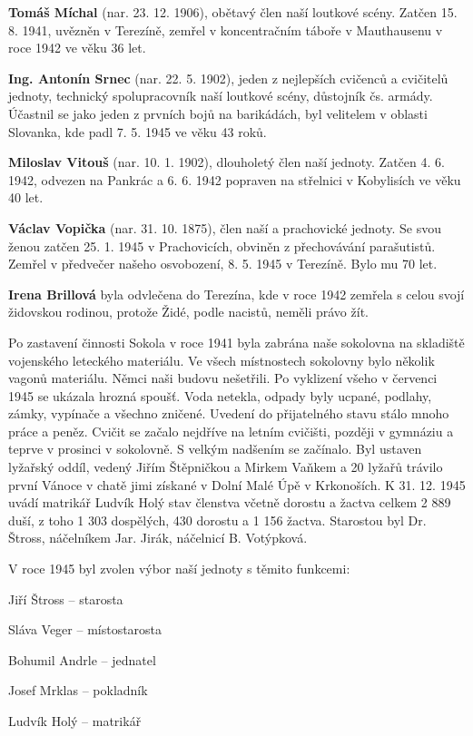 \textbf{Tomáš Míchal} (nar. 23. 12. 1906), obětavý člen naší loutkové
scény. Zatčen 15. 8. 1941, uvězněn v Terezíně, zemřel v koncentračním
táboře v Mauthausenu v roce 1942 ve věku 36 let.

\textbf{Ing. Antonín Srnec} (nar. 22. 5. 1902), jeden z nejlepších
cvičenců a cvičitelů jednoty, technický spolupracovník naší loutkové
scény, důstojník čs. armády. Účastnil se jako jeden z prvních bojů na
barikádách, byl velitelem v oblasti Slovanka, kde padl 7. 5. 1945 ve
věku 43 roků.

\textbf{Miloslav Vitouš} (nar. 10. 1. 1902), dlouholetý člen naší
jednoty. Zatčen 4. 6. 1942, odvezen na Pankrác a 6. 6. 1942 popraven na
střelnici v Kobylisích ve věku 40 let.

\textbf{Václav Vopička} (nar. 31. 10. 1875), člen naší a prachovické
jednoty. Se svou ženou zatčen 25. 1. 1945 v Prachovicích, obviněn z
přechovávání parašutistů. Zemřel v předvečer našeho osvobození, 8. 5.
1945 v Terezíně. Bylo mu 70 let.

\textbf{Irena Brillová} byla odvlečena do Terezína, kde v roce 1942
zemřela s celou svojí židovskou rodinou, protože Židé, podle nacistů,
neměli právo žít.

Po zastavení činnosti Sokola v roce 1941 byla zabrána naše sokolovna na
skladiště vojenského leteckého materiálu. Ve všech místnostech sokolovny
bylo několik vagonů materiálu. Němci naši budovu nešetřili. Po vyklizení
všeho v červenci 1945 se ukázala hrozná spoušť. Voda netekla, odpady
byly ucpané, podlahy, zámky, vypínače a všechno zničené. Uvedení do
přijatelného stavu stálo mnoho práce a peněz. Cvičit se začalo nejdříve
na letním cvičišti, později v gymnáziu a teprve v prosinci v sokolovně.
S velkým nadšením se začínalo. Byl ustaven lyžařský oddíl, vedený Jiřím
Štěpničkou a Mirkem Vaňkem a 20 lyžařů trávilo první Vánoce v chatě jimi
získané v Dolní Malé Úpě v Krkonoších. K 31. 12. 1945 uvádí matrikář
Ludvík Holý stav členstva včetně dorostu a žactva celkem 2 889 duší, z
toho 1 303 dospělých, 430 dorostu a 1 156 žactva. Starostou byl Dr.
Štross, náčelníkem Jar. Jirák, náčelnicí B. Votýpková.

V roce 1945 byl zvolen výbor naší jednoty s těmito funkcemi:

Jiří Štross -- starosta

Sláva Veger -- místostarosta

Bohumil Andrle -- jednatel

Josef Mrklas -- pokladník

Ludvík Holý -- matrikář

